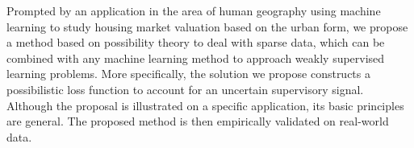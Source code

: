 
Prompted by an application in the area of human geography using machine learning to
study housing market valuation based on the urban form, we propose a method based on
possibility theory to deal with sparse data, which can be combined with any machine learning
method to approach weakly supervised learning problems.
More specifically, the solution we propose constructs a possibilistic
loss function to account for an uncertain supervisory signal.
Although the proposal is illustrated on a specific application, its basic principles
are general. The proposed method is then empirically validated on real-world data.

